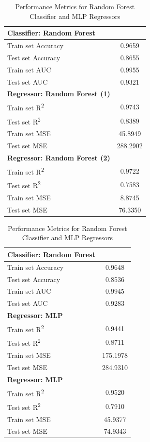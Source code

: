 \documentclass[12pt]{article}
\begin{document}
\begin{table}[h!]
\centering
\begin{minipage}{0.48\textwidth}
\centering
\caption{Performance Metrics for Random Forest Classifier and Regressor}
\begin{tabular}{|l|c|}
\hline
\textbf{Classifier: Random Forest} & \\
\hline
Train set Accuracy & 0.9659 \\
Test set Accuracy & 0.8655 \\
Train set AUC & 0.9955 \\
Test set AUC & 0.9321 \\
\hline
\textbf{Regressor: Random Forest (1)} & \\
\hline
Train set R\textsuperscript{2} & 0.9743 \\
Test set R\textsuperscript{2} & 0.8389 \\
Train set MSE & 45.8949 \\
Test set MSE & 288.2902 \\
\hline
\textbf{Regressor: Random Forest (2)} & \\
\hline
Train set R\textsuperscript{2} & 0.9722 \\
Test set R\textsuperscript{2} & 0.7583 \\
Train set MSE & 8.8745 \\
Test set MSE & 76.3350 \\
\hline
\end{tabular}
\label{tab:random_forest_metrics}
\end{minipage}
\hspace{0.02\textwidth} %
\begin{minipage}{0.48\textwidth}
\centering
\caption{Performance Metrics for Random Forest Classifier and MLP Regressors}
\begin{tabular}{|l|c|}
\hline
\textbf{Classifier: Random Forest} & \\
\hline
Train set Accuracy & 0.9648 \\
Test set Accuracy & 0.8536 \\
Train set AUC & 0.9945 \\
Test set AUC & 0.9283  \\
\hline
\textbf{Regressor: MLP} & \\
\hline
Train set R\textsuperscript{2} & 0.9441 \\
Test set R\textsuperscript{2} & 0.8711 \\
Train set MSE & 175.1978  \\
Test set MSE & 284.9310 \\
\hline
\textbf{Regressor: MLP} & \\
\hline
Train set R\textsuperscript{2} & 0.9520  \\
Test set R\textsuperscript{2} & 0.7910 \\
Train set MSE & 45.9377 \\
Test set MSE & 74.9343 \\
\hline
\end{tabular}
\label{tab:mlp_metrics}
\end{minipage}
\end{table}
\end{document}
